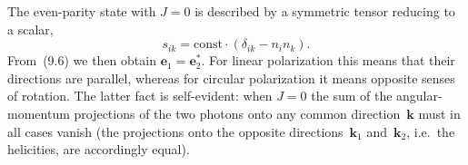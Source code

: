 The even-parity state with $J = 0$ is described by a symmetric tensor reducing to a scalar,
\[
s_{ik} = \text{const} \cdot (\delta_{ik} - n_in_k).
\]
From~(9.6) we then obtain $\mathbf{e}_1 = \mathbf{e}_2^*$. For linear polarization this means that their directions are parallel, whereas for circular polarization it means opposite senses of rotation. The latter fact is self-evident: when $J = 0$ the sum of the angular-momentum projections of the two photons onto any common direction~$\mathbf{k}$ must in all cases vanish (the projections onto the opposite directions~$\mathbf{k}_1$ and~$\mathbf{k}_2$, i.e.\ the helicities, are accordingly equal).

